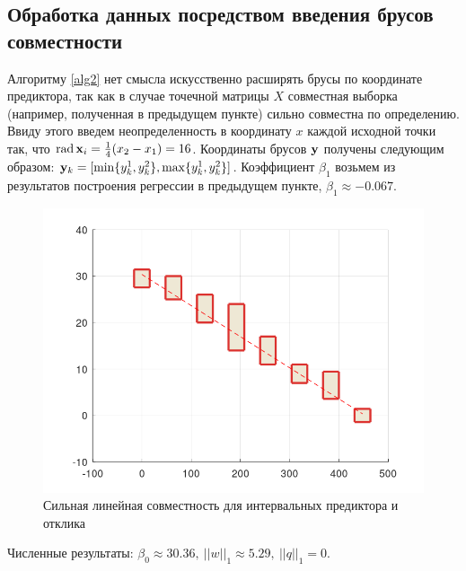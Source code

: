 \documentclass[a4paper]{article}
\begin{document}
\subsection{Обработка данных посредством введения брусов совместности}
Алгоритму \ref{alg2} нет смысла искусственно расширять брусы по координате предиктора, так как в случае точечной матрицы $X$ совместная выборка (например, полученная в предыдущем пункте) сильно совместна по определению. Ввиду этого введем неопределенность в координату $x$ каждой исходной точки так, что $\operatorname{rad}\mathbf{x}_i=\frac{1}{4}(x_2-x_1)=16$. Координаты брусов $\mathbf{y}$ получены следующим образом: $\mathbf{y}_k=[\min\{y_k^1,y_k^2\}, \max\{y_k^1,y_k^2\}]$. Коэффициент $\beta_1$ возьмем из результатов построения регрессии в предыдущем пункте, $\beta_1\approx-0.067$.
\begin{figure}[H]
    \centering
    \includegraphics[width=15cm]{img/res_2.png}
    \caption{Сильная линейная совместность для интервальных предиктора и отклика}
    \label{fig:res_2}
\end{figure}
Численные результаты: $\beta_0\approx30.36,\:||w||_1\approx5.29,\:||q||_1=0$.
\end{document}
